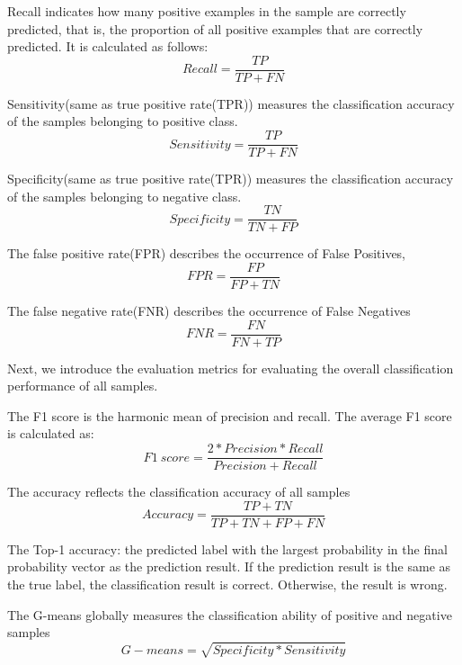\documentclass[10pt,journal,compsoc]{IEEEtran}
\begin{document}
	Recall indicates how many positive examples in the sample are correctly predicted, that is, the proportion of all positive examples that are correctly predicted. It is calculated as follows:
	\begin{equation}
	Recall=\frac{TP}{TP + FN}
	\end{equation}
	
	Sensitivity(same as true positive rate(TPR)) measures the classification accuracy of the samples belonging to positive class.
	\begin{equation}
	Sensitivity=\frac{TP}{TP + FN}
	\end{equation}
	
	Specificity(same as true positive rate(TPR)) measures the classification accuracy of the samples belonging to negative class.
	\begin{equation}
	Specificity=\frac{TN}{TN + FP}
	\end{equation}
	
	The false positive rate(FPR) describes the occurrence of False Positives, 
	\begin{equation}
	FPR=\frac{FP}{FP + TN}
	\end{equation}
	
	The false negative rate(FNR) describes the occurrence of False Negatives
	\begin{equation}
	FNR=\frac{FN}{FN + TP}
	\end{equation}
	
	Next, we introduce the evaluation metrics for evaluating the overall classification performance of all samples.
	
	The F1 score is the harmonic mean of precision and recall. The average F1 score is calculated as:
	\begin{equation}
	F1\ score=\frac{2*Precision*Recall}{Precision + Recall}
	\end{equation}
	
	The accuracy reflects the classification accuracy of all samples
	\begin{equation}
	Accuracy=\frac{TP+TN}{TP + TN+FP+FN}
	\end{equation}
	
	The Top-1 accuracy: the predicted label with the largest probability in the final probability vector as the prediction result. If the prediction result is the same as the true label, the classification result is correct. Otherwise, the result is wrong.
	
	The G-means globally measures the classification ability of positive and negative samples
	\begin{equation}
	G-means=\sqrt{Specificity \ast  Sensitivity}
	\end{equation}
	
\end{document}
